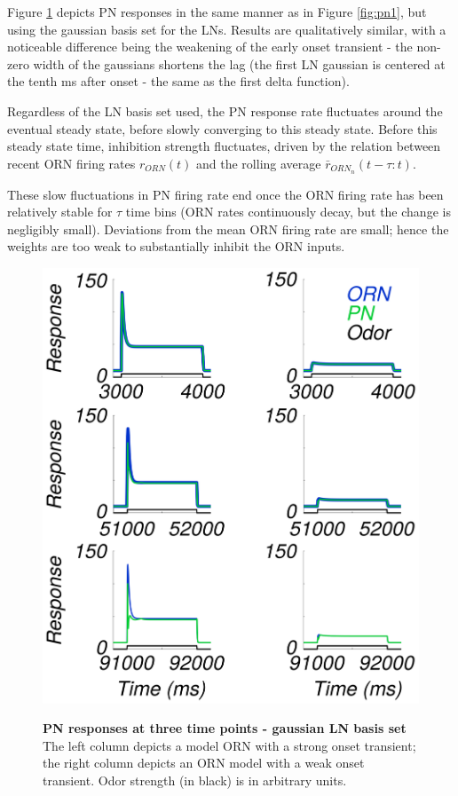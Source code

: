 \documentclass[a4paper,12pt,twoside]{article}
\begin{document}
Figure \ref{fig:pn2} depicts PN responses in the same manner as in Figure \ref{fig:pn1}, but using the gaussian basis set for the LNs. Results are qualitatively similar, with a noticeable difference being the weakening of the early onset transient - the non-zero width of the gaussians shortens the lag (the first LN gaussian is centered at the tenth ms after onset - the same as the first delta function).  

Regardless of the LN basis set used, the PN response rate fluctuates around the eventual steady state, before slowly converging to this steady state.  Before this steady state time, inhibition strength fluctuates, driven by the relation between recent ORN firing rates $r_{ORN}(t)$ and the rolling average $\bar{r}_{ORN_n}(t - \tau : t).$  

These slow fluctuations in PN firing rate end once the ORN firing rate has been relatively stable for $\tau$ time bins (ORN rates continuously decay, but the change is negligibly small).  Deviations from the mean ORN firing rate are small; hence the weights are too weak to substantially inhibit the ORN inputs.

\begin{figure}
\centering
\caption{\textbf{PN responses at three time points - gaussian LN basis set}  The left column depicts a model ORN with a strong onset transient; the right column depicts an ORN model with a weak onset transient.  Odor strength (in black) is in arbitrary units.}
\hspace*{-1.5cm}
\includegraphics[scale=0.7]{2016-09-01_PN_3timepoints.png}
\label{fig:pn2}
\end{figure}
\end{document}
